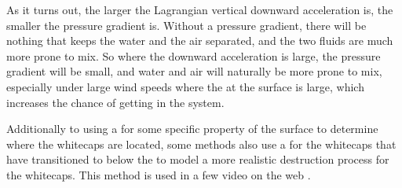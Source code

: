 As it turns out, the larger the Lagrangian vertical downward acceleration is, the smaller the pressure gradient is. Without a pressure gradient, there will be nothing that keeps the water and the air separated, and the two fluids are much more prone to mix. So where the downward acceleration is large, the pressure gradient will be small, and water and air will naturally be more prone to mix, especially under large wind speeds where the  at the surface is large, which increases the chance of getting  in the system.

Additionally to using a \threshold for some specific property of the surface to determine where the whitecaps are located, some methods also use a  for the whitecaps that have transitioned to below the \threshold to model a more realistic destruction process for the whitecaps. This method is used in a few video on the web \citep{ozernik2009,cebasVT2010}.

